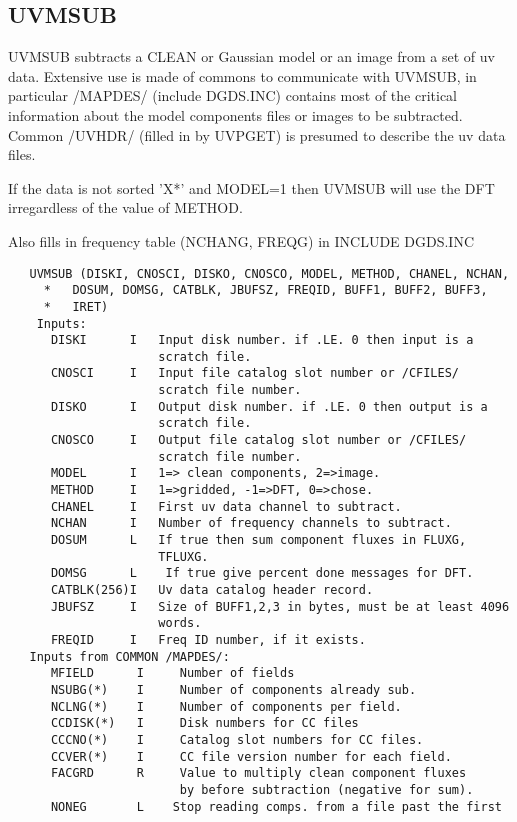 \subsection{UVMSUB}
UVMSUB subtracts a CLEAN or Gaussian model or an image from a set of
uv data.  Extensive use is made of commons to communicate with UVMSUB,
in particular /MAPDES/ (include DGDS.INC) contains most of the
critical information about the model components files or images to be
subtracted.  Common /UVHDR/ (filled in by UVPGET) is presumed to
describe the uv data files.

   If the data is not sorted 'X*' and MODEL=1 then UVMSUB will use
the DFT irregardless of the value of METHOD.

   Also fills in frequency table (NCHANG, FREQG) in INCLUDE DGDS.INC
\begin{verbatim}
   UVMSUB (DISKI, CNOSCI, DISKO, CNOSCO, MODEL, METHOD, CHANEL, NCHAN,
     *   DOSUM, DOMSG, CATBLK, JBUFSZ, FREQID, BUFF1, BUFF2, BUFF3,
     *   IRET)
    Inputs:
      DISKI      I   Input disk number. if .LE. 0 then input is a
                     scratch file.
      CNOSCI     I   Input file catalog slot number or /CFILES/
                     scratch file number.
      DISKO      I   Output disk number. if .LE. 0 then output is a
                     scratch file.
      CNOSCO     I   Output file catalog slot number or /CFILES/
                     scratch file number.
      MODEL      I   1=> clean components, 2=>image.
      METHOD     I   1=>gridded, -1=>DFT, 0=>chose.
      CHANEL     I   First uv data channel to subtract.
      NCHAN      I   Number of frequency channels to subtract.
      DOSUM      L   If true then sum component fluxes in FLUXG,
                     TFLUXG.
      DOMSG      L    If true give percent done messages for DFT.
      CATBLK(256)I   Uv data catalog header record.
      JBUFSZ     I   Size of BUFF1,2,3 in bytes, must be at least 4096
                     words.
      FREQID     I   Freq ID number, if it exists.
   Inputs from COMMON /MAPDES/:
      MFIELD      I     Number of fields
      NSUBG(*)    I     Number of components already sub.
      NCLNG(*)    I     Number of components per field.
      CCDISK(*)   I     Disk numbers for CC files
      CCCNO(*)    I     Catalog slot numbers for CC files.
      CCVER(*)    I     CC file version number for each field.
      FACGRD      R     Value to multiply clean component fluxes
                        by before subtraction (negative for sum).
      NONEG       L    Stop reading comps. from a file past the first

\end{verbatim}
